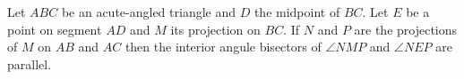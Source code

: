 Let $ABC$ be an acute-angled triangle and $D$ the midpoint of $BC$. Let $E$ be a point  on segment $AD$ and $M$ its projection on $BC$. If $N$ and $P$ are the projections of $M$ on $AB$ and $AC$ then the interior angule bisectors of $\angle NMP$ and $\angle NEP$ are parallel.